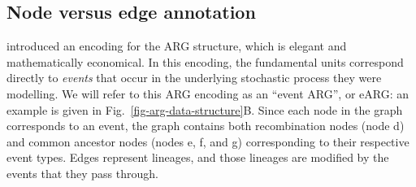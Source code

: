 \documentclass{article}
\begin{document}
\subsection*{Node versus edge annotation}

\citet{griffiths1996ancestral} introduced an encoding for the ARG structure, which
is elegant and mathematically economical. In this encoding, the
fundamental units correspond directly to \emph{events}
that occur in the underlying stochastic process they were modelling.
We will refer to this ARG encoding as an ``event ARG'', or eARG:
an example is given in Fig.~\ref{fig-arg-data-structure}B.
Since each node in the graph corresponds to an event, the graph
contains both recombination nodes (node \textsf{d}) and common ancestor
nodes (nodes \textsf{e}, \textsf{f}, and \textsf{g}) corresponding to their
respective event types. Edges represent lineages,
and those lineages are modified by the events that they pass through.
\end{document}
